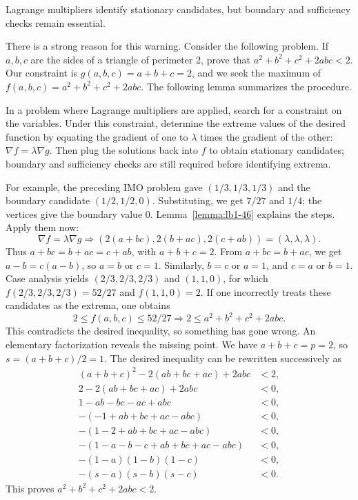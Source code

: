 \documentclass[11pt,a4paper]{article}
\begin{document}
\setcounter{theorem}{39}\begin{lemma}
Lagrange multipliers identify stationary candidates, but boundary and sufficiency checks remain essential.
\end{lemma}
There is a strong reason for this warning. Consider the following problem.
If $a,b,c$ are the sides of a triangle of perimeter $2$, prove that $a^2+b^2+c^2+2abc<2$.
Our constraint is $g(a,b,c)=a+b+c=2$, and we seek the maximum of
$f(a,b,c)=a^2+b^2+c^2+2abc$. The following lemma summarizes the procedure.

\setcounter{theorem}{40}\begin{lemma}\label{lemma:lb1-46}
In a problem where Lagrange multipliers are applied, search for a constraint on the variables.
Under this constraint, determine the extreme values of the desired function by equating the gradient of one to $\lambda$ times the gradient of the other:
$\nabla f=\lambda\nabla g$.
Then plug the solutions back into $f$ to obtain stationary candidates; boundary
and sufficiency checks are still required before identifying extrema.
\end{lemma}
For example, the preceding IMO problem gave $(1/3,1/3,1/3)$ and the
boundary candidate $(1/2,1/2,0)$. Substituting, we get $7/27$ and $1/4$;
the vertices give the boundary value $0$.
Lemma~\ref{lemma:lb1-46} explains the steps. Apply them now:
\[
\nabla f=\lambda\nabla g
\Longrightarrow(2(a+bc),2(b+ac),2(c+ab))=(\lambda,\lambda,\lambda).
\]
Thus $a+bc=b+ac=c+ab$, with $a+b+c=2$.
From $a+bc=b+ac$, we get $a-b=c(a-b)$, so $a=b$ or $c=1$.
Similarly, $b=c$ or $a=1$, and $c=a$ or $b=1$.
Case analysis yields $(2/3,2/3,2/3)$ and $(1,1,0)$, for which
$f(2/3,2/3,2/3)=52/27$ and $f(1,1,0)=2$.
If one incorrectly treats these candidates as the extrema, one obtains
\[
2\leq f(a,b,c)\leq52/27
\Longrightarrow2\leq a^2+b^2+c^2+2abc.
\]
This contradicts the desired inequality, so something has gone wrong. An elementary factorization reveals the missing point.
We have $a+b+c=p=2$, so $s=(a+b+c)/2=1$.
The desired inequality can be rewritten successively as
\begin{align*}
(a+b+c)^2-2(ab+bc+ac)+2abc&<2,\\
2-2(ab+bc+ac)+2abc&<0,\\
1-ab-bc-ac+abc&<0,\\
-(-1+ab+bc+ac-abc)&<0,\\
-(1-2+ab+bc+ac-abc)&<0,\\
-(1-a-b-c+ab+bc+ac-abc)&<0,\\
-(1-a)(1-b)(1-c)&<0,\\
-(s-a)(s-b)(s-c)&<0.
\end{align*}
This proves $a^2+b^2+c^2+2abc<2$.
\end{document}
